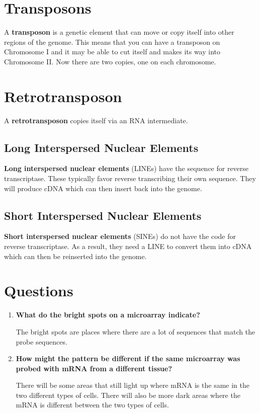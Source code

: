 \documentclass{article}
\begin{document}
\section{Transposons}

A \textbf{transposon} is a genetic element that can move or copy itself into
other regions of the genome. This means that you can have a transposon on
Chromosome I and it may be able to cut itself and makes its way into Chromosome
II. Now there are two copies, one on each chromosome.

\section{Retrotransposon}

A \textbf{retrotransposon} copies itself via an RNA intermediate.

\subsection{Long Interspersed Nuclear Elements}

\textbf{Long interspersed nuclear elements} (LINEs) have the sequence for
reverse transcriptase. These typically favor reverse transcribing their own
sequence. They will produce cDNA which can then insert back into the genome. 

\subsection{Short Interspersed Nuclear Elements}

\textbf{Short interspersed nuclear elements} (SINEs) do not have the code for
reverse transcriptase. As a result, they need a LINE to convert them into cDNA
which can then be reinserted into the genome.

\section{Questions}

\begin{enumerate}

    \item \textbf{What do the bright spots on a microarray indicate?}
    
    The bright spots are places where there are a lot of sequences that match
    the probe sequences.
    
    \item \textbf{How might the pattern be different if the same microarray was
        probed with mRNA from a different tissue?}
    
    There will be some areas that still light up where mRNA is the same in the
    two different types of cells. There will also be more dark areas where the
    mRNA is different between the two types of cells.
    
\end{enumerate}
\end{document}
